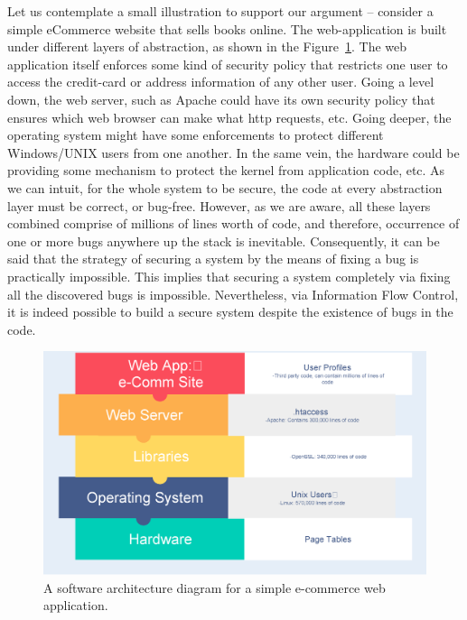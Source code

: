 Let us contemplate a small illustration to support our argument – consider a simple eCommerce website that sells books online. The web-application is built under different layers of abstraction, as shown in the Figure~\ref{fig:eCommerceArchitecture}. The web application itself enforces some kind of security policy that restricts one user to access the credit-card or address information of any other user. Going a level down, the web server, such as Apache could have its own security policy that ensures which web browser can make what http requests, etc. Going deeper, the operating system might have some enforcements to protect different Windows/UNIX users from one another. In the same vein, the hardware could be providing some mechanism to protect the kernel from application code, etc. As we can intuit, for the whole system to be secure, the code at every abstraction layer must be correct, or bug-free. However, as we are aware, all these layers combined comprise of millions of lines worth of code, and therefore, occurrence of one or more bugs anywhere up the stack is inevitable. Consequently, it can be said that the strategy of securing a system by the means of fixing a bug is practically impossible. This implies that securing a system completely via fixing all the discovered bugs is impossible. Nevertheless, via Information Flow Control, it is indeed possible to build a secure system despite the existence of bugs in the code.

\begin{figure}[h]
	\begin{framed}
		\centering
		\includegraphics[width=\textwidth]{images/architectures.eps}
		\caption{A software architecture diagram for a simple e-commerce web application.}
		\label{fig:eCommerceArchitecture}
	\end{framed}
\end{figure}

